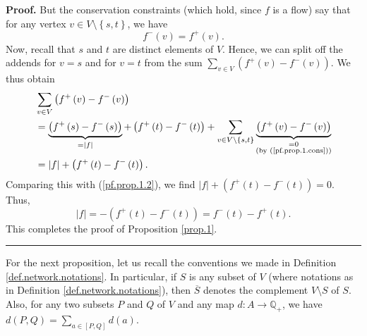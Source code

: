 \documentclass[numbers=enddot,12pt,final,onecolumn,notitlepage]{scrartcl}%
\theoremstyle{definition}
\newenvironment{proof}[1][Proof]{\noindent\textbf{#1.} }{\ \rule{0.5em}{0.5em}}
\let\sumnonlimits\sum
\renewcommand{\sum}{\sumnonlimits\limits}
\begin{document}
\begin{proof}
But the conservation constraints (which hold, since $f$ is a flow) say that
for any vertex $v\in V\setminus\left\{  s,t\right\}  $, we have%
\begin{equation}
f^{-}\left(  v\right)  =f^{+}\left(  v\right)  . \label{pf.prop.1.cons}%
\end{equation}
Now, recall that $s$ and $t$ are distinct elements of $V$. Hence, we can split
off the addends for $v=s$ and for $v=t$ from the sum $\sum_{v\in V}\left(
f^{+}\left(  v\right)  -f^{-}\left(  v\right)  \right)  $. We thus obtain%
\begin{align*}
&  \sum_{v\in V}\left(  f^{+}\left(  v\right)  -f^{-}\left(  v\right)  \right)
\\
&  =\underbrace{\left(  f^{+}\left(  s\right)  -f^{-}\left(  s\right)
\right)  }_{=\left\vert f\right\vert }+\left(  f^{+}\left(  t\right)
-f^{-}\left(  t\right)  \right)  +\sum_{v\in V\setminus\left\{  s,t\right\}
}\underbrace{\left(  f^{+}\left(  v\right)  -f^{-}\left(  v\right)  \right)
}_{\substack{=0\\\text{(by (\ref{pf.prop.1.cons}))}}}\\
&  =\left\vert f\right\vert +\left(  f^{+}\left(  t\right)  -f^{-}\left(
t\right)  \right)  .
\end{align*}
Comparing this with (\ref{pf.prop.1.2}), we find $\left\vert f\right\vert
+\left(  f^{+}\left(  t\right)  -f^{-}\left(  t\right)  \right)  =0$. Thus,%
\[
\left\vert f\right\vert =-\left(  f^{+}\left(  t\right)  -f^{-}\left(
t\right)  \right)  =f^{-}\left(  t\right)  -f^{+}\left(  t\right)  .
\]
This completes the proof of Proposition \ref{prop.1}.
\end{proof}

For the next proposition, let us recall the conventions we made in Definition
\ref{def.network.notations}. In particular, if $S$ is any subset of $V$ (where
notations as in Definition \ref{def.network.notations}), then $\overline{S}$
denotes the complement $V\setminus S$ of $S$. Also, for any two subsets $P$
and $Q$ of $V$ and any map $d:A\rightarrow\mathbb{Q}_{+}$, we have $d\left(
P,Q\right)  =\sum_{a\in\left[  P,Q\right]  }d\left(  a\right)  $.
\end{document}
